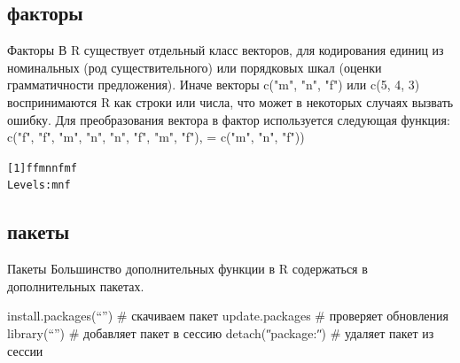 \subsection{факторы}
\begin{frame}[fragile]{Факторы}
В R существует отдельный класс векторов, для кодирования единиц из номинальных (род существительного) или порядковых шкал (оценки грамматичности предложения). Иначе векторы c("m"{}, "n"{}, "f") или c(5, 4, 3) воспринимаются R как строки или числа, что может в некоторых случаях вызвать ошибку. Для преобразования вектора в фактор используется следующая функция:\bigskip\\
{\color{red!13!blue}{factor(}}c("f"{}, "f"{}, "m"{}, "n"{}, "n"{}, "f"{}, "m"{}, "f"), {\color{red!13!blue}{levels}} = c("m"{}, "n"{}, "f"))
\footnotesize
\begin{alltt}
[1] f f m n n f m f
Levels: m n f
\end{alltt}
\normalsize
\end{frame}
\subsection{пакеты}
\begin{frame}{Пакеты}
Большинство дополнительных функции в R содержаться в дополнительных пакетах.
\begin{itemize}
\mytem install.packages(“{\color{red!13!blue}{pkg}}”) \hfill \# скачиваем пакет
\mytem update.packages \hfill \# проверяет обновления
\mytem library(“{\color{red!13!blue}{pkg}}”) \hfill \# добавляет пакет в сессию
\mytem detach(ʺpackage:{\color{red!13!blue}{pkg}}ʺ) \hfill \# удаляет пакет из сессии
\end{itemize}
\end{frame}
